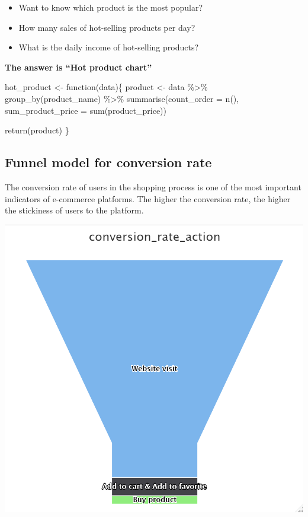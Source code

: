 \documentclass[
  11pt,
]{article}
\newenvironment{Shaded}{\begin{snugshade}}{\end{snugshade}}
\newcommand{\AttributeTok}[1]{\textcolor[rgb]{0.40,0.45,0.13}{#1}}
\newcommand{\ControlFlowTok}[1]{\textcolor[rgb]{0.00,0.23,0.31}{#1}}
\newcommand{\FunctionTok}[1]{\textcolor[rgb]{0.28,0.35,0.67}{#1}}
\newcommand{\NormalTok}[1]{\textcolor[rgb]{0.00,0.23,0.31}{#1}}
\newcommand{\OtherTok}[1]{\textcolor[rgb]{0.00,0.23,0.31}{#1}}
\newcommand{\SpecialCharTok}[1]{\textcolor[rgb]{0.37,0.37,0.37}{#1}}
\providecommand{\tightlist}{%
  \setlength{\itemsep}{0pt}\setlength{\parskip}{0pt}}\usepackage{longtable,booktabs,array}
\begin{document}
\begin{itemize}
\tightlist
\item
  Want to know which product is the most popular?
\item
  How many sales of hot-selling products per day?
\item
  What is the daily income of hot-selling products?
\end{itemize}

\textbf{The answer is ``Hot product chart''}

\begin{Shaded}
\begin{Highlighting}[]
\NormalTok{hot\_product }\OtherTok{\textless{}{-}} \ControlFlowTok{function}\NormalTok{(data)\{}
\NormalTok{    product }\OtherTok{\textless{}{-}}\NormalTok{ data }\SpecialCharTok{\%\textgreater{}\%}
      \FunctionTok{group\_by}\NormalTok{(product\_name) }\SpecialCharTok{\%\textgreater{}\%}
      \FunctionTok{summarise}\NormalTok{(}\AttributeTok{count\_order =} \FunctionTok{n}\NormalTok{(),}
                \AttributeTok{sum\_product\_price =} \FunctionTok{sum}\NormalTok{(product\_price))}

    \FunctionTok{return}\NormalTok{(product)}
\NormalTok{\}}
\end{Highlighting}
\end{Shaded}

\hypertarget{funnel-model-for-conversion-rate}{%
\subsection{Funnel model for conversion
rate}\label{funnel-model-for-conversion-rate}}

The conversion rate of users in the shopping process is one of the most
important indicators of e-commerce platforms. The higher the conversion
rate, the higher the stickiness of users to the platform.

\includegraphics{img/funnel1.png}
\end{document}
